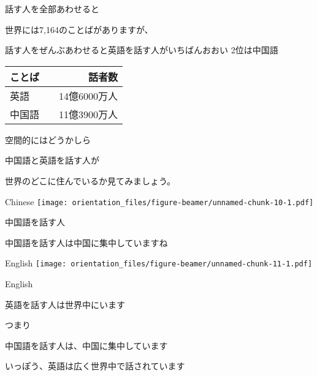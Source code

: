 \documentclass[
  ignorenonframetext,
  aspectratio=169,
  xcolor=dvipsnames]{beamer}
\begin{document}
\begin{frame}{話す人を全部あわせると}
\label{ux8a71ux3059ux4ebaux3092ux5168ux90e8ux3042ux308fux305bux308bux3068}
\Large

世界には7,164のことばがありますが、

話す人をぜんぶあわせると\pause 英語を話す人がいちばんおおい\pause
2位は中国語\pause

\centering
\vfill

\begin{tabular}{lr}\toprule
ことば&話者数\\
\midrule
英語&14億6000万人\\
中国語　&11億3900万人\\
\bottomrule
\end{tabular}
\end{frame}

\begin{frame}{空間的にはどうかしら}
\label{ux7a7aux9593ux7684ux306bux306fux3069ux3046ux304bux3057ux3089}
\Large

中国語と英語を話す人が

世界のどこに住んでいるか見てみましょう。
\end{frame}

\begin{frame}{Chinese}
\label{chinese}
\texttt{[image: orientation\_files/figure-beamer/unnamed-chunk-10-1.pdf]}
\end{frame}

\begin{frame}{中国語を話す人}
\label{ux4e2dux56fdux8a9eux3092ux8a71ux3059ux4eba}
\Large

中国語を話す人は中国に集中していますね
\end{frame}

\begin{frame}{English}
\label{english}
\texttt{[image: orientation\_files/figure-beamer/unnamed-chunk-11-1.pdf]}
\end{frame}

\begin{frame}{English}
\label{english-1}
\Large

英語を話す人は世界中にいます
\end{frame}

\begin{frame}{つまり}
\label{ux3064ux307eux308a-1}
\Large

中国語を話す人は、中国に集中しています\pause

いっぽう、英語は広く世界中で話されています
\end{frame}
\end{document}
